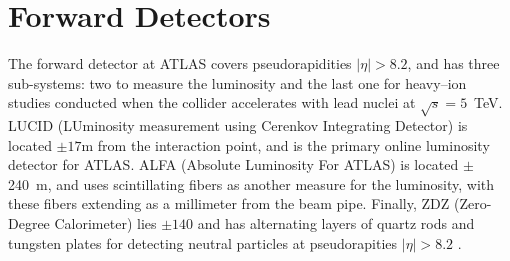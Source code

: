 \section{Forward Detectors}
The forward detector at ATLAS covers pseudorapidities $|\eta| > 8.2$, and has three sub-systems: two to measure the luminosity and the last one for heavy--ion studies conducted when the collider accelerates with lead nuclei at $\sqrt{s}=5$~TeV.
LUCID (LUminosity measurement using Cerenkov Integrating Detector) is located $\pm 17$m from the interaction point, and is the primary online luminosity detector for ATLAS.
ALFA (Absolute Luminosity For ATLAS) is located $\pm$240~m, and uses scintillating fibers as another measure for the luminosity, with these fibers extending as a millimeter from the beam pipe.
Finally, ZDZ (Zero-Degree Calorimeter) lies $\pm 140$ and has alternating layers of quartz rods and tungsten plates for detecting neutral particles at pseudorapities $|\eta| > 8.2$ \cite{ATLAS_long}.